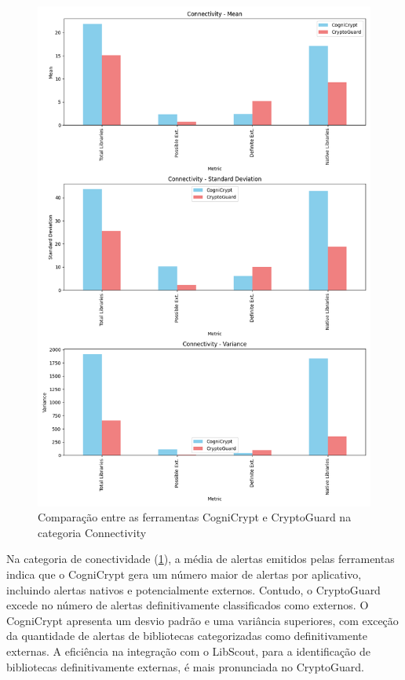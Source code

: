 \begin{figure}[!ht]
  \centering
  \includegraphics[scale=0.7]{img/plot_cc_x_cg_connectivity.png}
  \caption{Comparação entre as ferramentas CogniCrypt e CryptoGuard na categoria Connectivity}
  \label{img: CCvsCG_Connectivity}
\end{figure}

Na categoria de conectividade (\ref{img: CCvsCG_Connectivity}), a média de alertas emitidos pelas ferramentas indica que o CogniCrypt gera um número maior de alertas por aplicativo, incluindo alertas nativos e potencialmente externos. Contudo, o CryptoGuard excede no número de alertas definitivamente classificados como externos.
O CogniCrypt apresenta um desvio padrão e uma variância superiores, com exceção da quantidade de alertas de bibliotecas categorizadas como definitivamente externas.
A eficiência na integração com o LibScout, para a identificação de bibliotecas definitivamente externas, é mais pronunciada no CryptoGuard.

